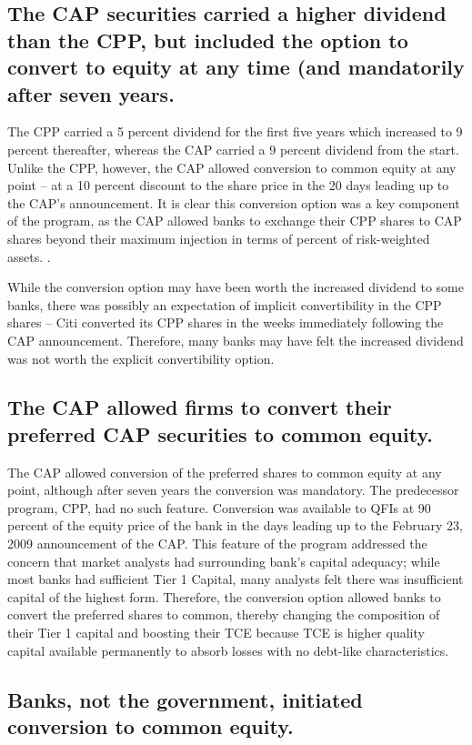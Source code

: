 \documentclass[12pt]{article}
\begin{document}
\subsection{The CAP securities carried a higher dividend than the CPP, but included the option to convert to equity at any time (and mandatorily after seven years.}

The CPP carried a 5 percent dividend for the first five years which increased to 9 percent thereafter, whereas the CAP carried a 9 percent dividend from the start. Unlike the CPP, however, the CAP allowed conversion to common equity at any point -- at a 10 percent discount to the share price in the 20 days leading up to the CAP's announcement. It is clear this conversion option was a key component of the program, as the CAP allowed banks to exchange their CPP shares to CAP shares beyond their maximum injection in terms of percent of risk-weighted assets. \citep{GW}.

While the conversion option may have been worth the increased dividend to some banks, there was possibly an expectation of implicit convertibility in the CPP shares -- Citi converted its CPP shares in the weeks immediately following the CAP announcement. Therefore, many banks may have felt the increased dividend was not worth the explicit convertibility option.

\subsection{The CAP allowed firms to convert their preferred CAP securities to common equity.}

The CAP allowed conversion of the preferred shares to common equity at any point, although after seven years the conversion was mandatory. The predecessor program, CPP, had no such feature. Conversion was available to QFIs at 90 percent of the equity price of the bank in the days leading up to the February 23, 2009 announcement of the CAP. This feature of the program addressed the concern that market analysts had surrounding bank's capital adequacy; while most banks had sufficient Tier 1 Capital, many analysts felt there was insufficient capital of the highest form. Therefore, the conversion option allowed banks to convert the preferred shares to common, thereby changing the composition of their Tier 1 capital and boosting their TCE because TCE is higher quality capital available permanently to absorb losses with no debt-like characteristics.

\subsection{Banks, not the government, initiated conversion to common equity.}
\end{document}
